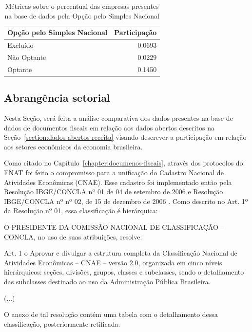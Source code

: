 \begin{table}[htb]
\centering
\caption{Métricas sobre o percentual das empresas presentes na base de dados pela Opção pelo Simples Nacional}
\label{tab:participacao-por-simples-nacional}
\begin{tabular}{lr}
\toprule
Opção pelo Simples Nacional & Participação \\
\midrule
Excluído     &    0.0693 \\
Não Optante  &    0.0229 \\
Optante      &    0.1450 \\
\bottomrule
\end{tabular}
\fdadospesquisa
\end{table}

\subsection{Abrangência setorial}

Nesta Seção, será feita a análise comparativa dos dados presentes na base de dados de documentos fiscais em relação aos dados abertos descritos na Seção~\ref{section:dados-abertos-receita} visando descrever a participação em relação aos setores econômicos da economia brasileira.

Como citado no Capítulo~\ref{chapter:documenos-fiscais}, através dos protocolos do ENAT foi feito o compromisso para a unificação do Cadastro Nacional de Atividades Econômicas (CNAE). Esse cadastro foi implementado então pela Resolução IBGE/CONCLA  nº 01 de 04 de setembro de 2006 \cite{resolucao-concla:01:cnae} e Resolução IBGE/CONCLA nº nº 02, de 15 de dezembro de 2006 \cite{resolucao-concla:02:cnae}. Como descrito no Art. 1º da Resolução nº 01, essa classificação é hierárquica:

\begin{citacao}
O PRESIDENTE DA COMISSÃO NACIONAL DE CLASSIFICAÇÃO –
CONCLA, no uso de suas atribuições, resolve:

Art. 1 o Aprovar e divulgar a estrutura completa da Classificação Nacional de Atividades Econômicas – CNAE – versão 2.0, organizada em cinco níveis hierárquicos: seções, divisões, grupos, classes e subclasses, sendo o detalhamento das subclasses destinado ao uso da Administração Pública Brasileira.

(...)
\end{citacao}

O anexo de tal resolução contém uma tabela com o detalhamento dessa classificação, posteriormente retificada.

